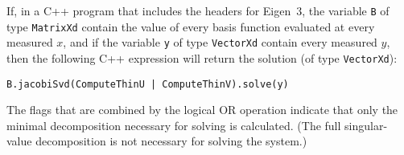 \documentclass[twocolumn]{article}
\begin{document}
If, in a C++ program that includes the headers for Eigen~3, the variable
\texttt{B} of type \texttt{MatrixXd} contain the value of every basis function
evaluated at every measured $x$, and if the variable \texttt{y} of type
\texttt{VectorXd} contain every measured $y$, then the following C++ expression
will return the solution (of type \texttt{VectorXd}):
\begin{small}
\begin{verbatim}
B.jacobiSvd(ComputeThinU | ComputeThinV).solve(y)
\end{verbatim}
\end{small}
The flags that are combined by the logical OR operation indicate that only the
minimal decomposition necessary for solving is calculated. (The full
singular-value decomposition is not necessary for solving the system.)

%
%
%
%

\newpage


\end{document}
